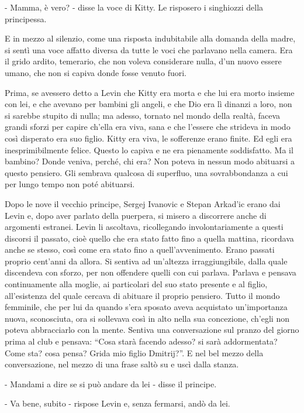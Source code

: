 - Mamma, è vero? - disse la voce di Kitty. Le risposero i singhiozzi della principessa. 

E in mezzo al silenzio, come una risposta indubitabile alla domanda della madre, si sentì una voce affatto diversa da tutte le voci che parlavano nella camera. Era il grido ardito, temerario, che non voleva considerare nulla, d'un nuovo essere umano, che non si capiva donde fosse venuto fuori. 

Prima, se avessero detto a Levin che Kitty era morta e che lui era morto insieme con lei, e che avevano per bambini gli angeli, e che Dio era lì dinanzi a loro, non si sarebbe stupito di nulla; ma adesso, tornato nel mondo della realtà, faceva grandi sforzi per capire ch'ella era viva, sana e che l'essere che strideva in modo così disperato era suo figlio. Kitty era viva, le sofferenze erano finite. Ed egli era inesprimibilmente felice. Questo lo capiva e ne era pienamente soddisfatto. Ma il bambino? Donde veniva, perché, chi era? Non poteva in nessun modo abituarsi a questo pensiero. Gli sembrava qualcosa di superfluo, una sovrabbondanza a cui per lungo tempo non poté abituarsi. 

\label{xvi-6} 

Dopo le nove il vecchio principe, Sergej Ivanovic e Stepan Arkad'ic erano dai Levin e, dopo aver parlato della puerpera, si misero a discorrere anche di argomenti estranei. Levin li ascoltava, ricollegando involontariamente a questi discorsi il passato, cioè quello che era stato fatto fino a quella mattina, ricordava anche se stesso, così come era stato fino a quell'avvenimento. Erano passati proprio cent'anni da allora. Si sentiva ad un'altezza irraggiungibile, dalla quale discendeva con sforzo, per non offendere quelli con cui parlava. Parlava e pensava continuamente alla moglie, ai particolari del suo stato presente e al figlio, all'esistenza del quale cercava di abituare il proprio pensiero. Tutto il mondo femminile, che per lui da quando s'era sposato aveva acquistato un'importanza nuova, sconosciuta, ora si sollevava così in alto nella sua concezione, ch'egli non poteva abbracciarlo con la mente. Sentiva una conversazione sul pranzo del giorno prima al club e pensava: ``Cosa starà facendo adesso? si sarà addormentata? Come sta? cosa pensa? Grida mio figlio Dmitrij?''. E nel bel mezzo della conversazione, nel mezzo di una frase saltò su e uscì dalla stanza. 

- Mandami a dire se si può andare da lei - disse il principe. 

- Va bene, subito - rispose Levin e, senza fermarsi, andò da lei. 

